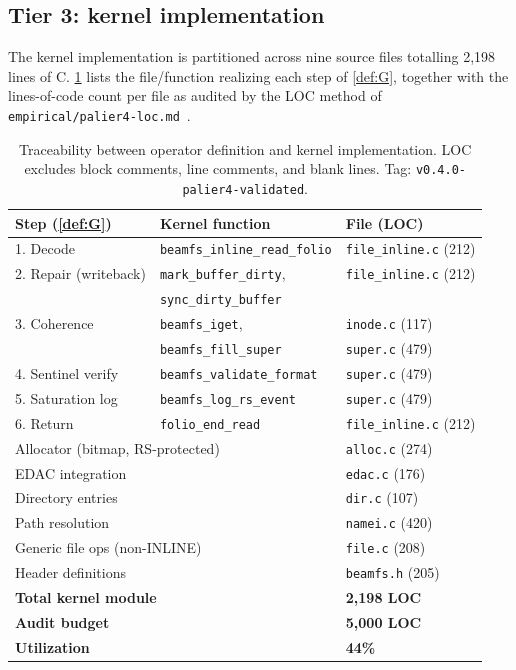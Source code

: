 \subsection{Tier 3: kernel implementation}\label{ssec:m2c-tier3}

The kernel implementation is partitioned across nine source files
totalling 2{,}198 lines of C. \cref{tab:m2c-trace} lists the
file/function realizing each step of \cref{def:G}, together with
the lines-of-code count per file as audited by the LOC method of
\texttt{empirical/palier4-loc.md}~\cite{beamfs-impl}.

\begin{table}[t]
\caption{Traceability between operator definition and kernel
implementation. LOC excludes block comments, line comments, and
blank lines. Tag: \texttt{v0.4.0-palier4-validated}.}
\label{tab:m2c-trace}
\centering
\small
\begin{tabular}{@{}lll@{}}
\toprule
Step (\cref{def:G}) & Kernel function & File (LOC) \\
\midrule
1. Decode               & \texttt{beamfs\_inline\_read\_folio}    & \texttt{file\_inline.c} (212) \\
2. Repair (writeback)   & \texttt{mark\_buffer\_dirty},           & \texttt{file\_inline.c} (212) \\
                        & \texttt{sync\_dirty\_buffer}            & \\
3. Coherence            & \texttt{beamfs\_iget},                  & \texttt{inode.c} (117) \\
                        & \texttt{beamfs\_fill\_super}            & \texttt{super.c} (479) \\
4. Sentinel verify      & \texttt{beamfs\_validate\_format}       & \texttt{super.c} (479) \\
5. Saturation log       & \texttt{beamfs\_log\_rs\_event}         & \texttt{super.c} (479) \\
6. Return               & \texttt{folio\_end\_read}               & \texttt{file\_inline.c} (212) \\
\midrule
\multicolumn{2}{l}{Allocator (bitmap, RS-protected)} & \texttt{alloc.c} (274) \\
\multicolumn{2}{l}{EDAC integration}                 & \texttt{edac.c} (176) \\
\multicolumn{2}{l}{Directory entries}                & \texttt{dir.c} (107) \\
\multicolumn{2}{l}{Path resolution}                  & \texttt{namei.c} (420) \\
\multicolumn{2}{l}{Generic file ops (non-INLINE)}    & \texttt{file.c} (208) \\
\multicolumn{2}{l}{Header definitions}               & \texttt{beamfs.h} (205) \\
\midrule
\multicolumn{2}{l}{\textbf{Total kernel module}}     & \textbf{2{,}198 LOC} \\
\multicolumn{2}{l}{\textbf{Audit budget}}            & \textbf{5{,}000 LOC} \\
\multicolumn{2}{l}{\textbf{Utilization}}             & \textbf{44\%} \\
\bottomrule
\end{tabular}
\end{table}

